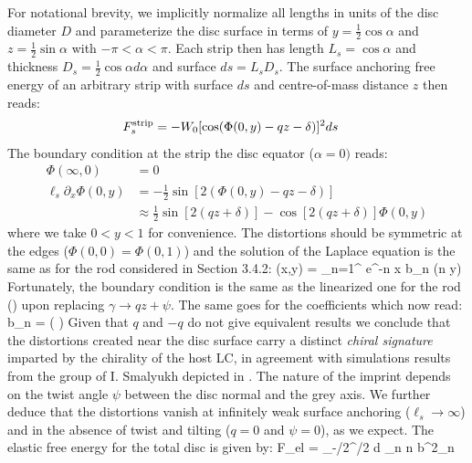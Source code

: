 For notational brevity, we implicitly normalize all lengths in units of the disc diameter $D$ and parameterize the disc surface in terms of $y = \tfrac{1}{2} \cos \alpha$ and $z = \tfrac{1}{2} \sin \alpha$ with $-\pi < \alpha <  \pi$. Each strip then has length $L_{s} = \cos \alpha$ and thickness $D_{s} = \tfrac{1}{2} \cos \alpha d \alpha$ and surface $ds = L_{s}D_{s} $. The surface anchoring free energy of an arbitrary strip with surface $ds$ and centre-of-mass distance $z$ then reads:
\begin{align}
F_{s}^{\rm strip}  &= -W_{0} [\cos (\Phi(0,y) - qz -\delta )]^{2} ds
\label{sadisc}
\end{align}
The boundary condition at the strip the disc equator ($\alpha=0)$ reads:
\begin{align}
\Phi(  \infty, 0 ) & =  0 \nonumber \\
\ell_{s} \partial_{x} \Phi(0, y ) & =   -\frac{1}{2 }   \sin [2 ( \Phi(0,y) - qz - \delta ) ] \nonumber \\
& \approx \frac{1}{2} \sin [2(qz + \delta)]  - \cos [2 (qz + \delta)] \Phi(0,y)
\label{bcdisc1}
\end{align}
where we take $0<y<1$ for convenience. The distortions should be symmetric at the edges ($\Phi (0,0)  = \Phi (0, 1)$)
and the solution of the Laplace equation is the same as for the rod considered in Section 3.4.2:
\beq
\Phi(x,y) = \sum_{n=1}^{\infty} e^{-n \pi x }  b_{n} \sin(n \pi y)
\label{seriesxy}
\eeq
Fortunately, the boundary condition  is the same as the linearized one  for the rod () upon replacing $\gamma \rightarrow qz + \psi $. The same goes for the coefficients which now read:
\beq
b_{n}  =  \left ( \right )
\label{bnscenario1}
\eeq
Given that  $q$ and $-q$ do not give equivalent results we conclude that the distortions created near the disc surface carry a distinct {\em chiral signature} imparted by the chirality of the host LC, in agreement with simulations results from the group of I. Smalyukh depicted in . The nature of the imprint depends on the twist angle $\psi$ between the disc normal and the grey axis.
We further deduce that the distortions vanish at infinitely weak surface anchoring ($\ell_{s} \rightarrow \infty$) and in the absence of twist and tilting ($q=0$ and $\psi=0$), as we expect. The elastic free energy for the total disc is given by:
\beq
\Delta F_{el} =   \int_{-\pi/2}^{\pi/2} d \alpha \cos \alpha \sum_{n} n b^{2}_{n}
